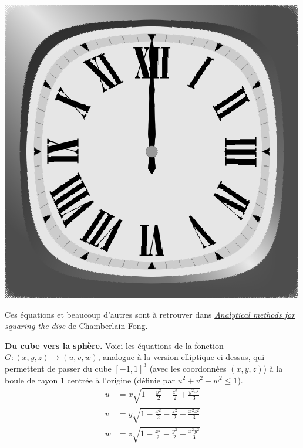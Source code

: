 \documentclass[11pt,class=report,crop=false]{standalone}
\begin{document}
\begin{center}
	\includegraphics[scale=\myscale,scale=0.25]{figures/image_disque_apres_2}		
\end{center}


Ces équations  et beaucoup d'autres sont à retrouver dans  \href{https://arxiv.org/pdf/1509.06344.pdf}{\emph{Analytical methods for squaring the disc}} de Chamberlain Fong. 
	
\medskip

\textbf{Du cube vers la sphère.}
Voici les équations de la fonction $G : (x,y,z) \mapsto (u,v,w)$, analogue à la version elliptique ci-dessus, qui permettent de passer du cube $[-1,1]^3$ (avec les coordonnées $(x,y,z)$) à la boule de rayon $1$ centrée à l'origine (définie par $u^2+v^2+w^2 \le 1$).
\begin{align*}
u  &= x\sqrt{1-\frac{y^2}{2}-\frac{z^2}{2}+\frac{y^2z^2}{3}} \\
v  &= y\sqrt{1-\frac{x^2}{2}-\frac{z^2}{2}+\frac{x^2z^2}{3}} \\
w  &= z\sqrt{1-\frac{x^2}{2}-\frac{y^2}{2}+\frac{x^2y^2}{3}} \\
\end{align*}
\end{document}
